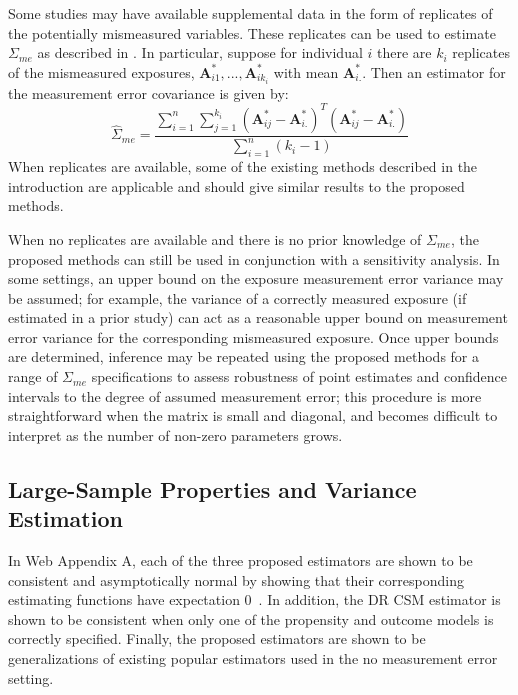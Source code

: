\documentclass[useAMS,usenatbib,referee]{biom}
\begin{document}
Some studies may have available supplemental data in the form of replicates of the potentially mismeasured variables. These replicates can be used to estimate $\Sigma_{me}$ as described in \citet{carroll2006}. In particular, suppose for individual $i$ there are $k_{i}$ replicates of the mismeasured exposures, $\bm{A}^{*}_{i1}, ..., \bm{A}^{*}_{ik_{i}}$ with mean $\bm{A}^{*}_{i.}$. Then an estimator for the measurement error covariance is given by:
\begin{equation*}
    \hat{\Sigma}_{me} = \frac{\sum_{i=1}^{n} \sum_{j=1}^{k_{i}} (\bm{A}^{*}_{ij} - \bm{A}^{*}_{i.})^{T}(\bm{A}^{*}_{ij} - \bm{A}^{*}_{i.})}{\sum_{i=1}^{n}(k_{i} - 1)}
\end{equation*}
When replicates are available, some of the existing methods described in the introduction are applicable and should give similar results to the proposed methods.

When no replicates are available and there is no prior knowledge of $\Sigma_{me}$, the proposed methods can still be used in conjunction with a sensitivity analysis. In some settings, an upper bound on the exposure measurement error variance may be assumed; for example, the variance of a correctly measured exposure (if estimated in a prior study) can act as a reasonable upper bound on measurement error variance for the corresponding mismeasured exposure. Once upper bounds are determined, inference may be repeated using the proposed methods for a range of $\Sigma_{me}$ specifications to assess robustness of point estimates and confidence intervals to the degree of assumed measurement error; this procedure is more straightforward when the matrix is small and diagonal, and becomes difficult to interpret as the number of non-zero parameters grows.

\subsection{Large-Sample Properties and Variance Estimation}

In Web Appendix A, each of the three proposed estimators are shown to be consistent and asymptotically normal by showing that their corresponding estimating functions have expectation 0~\citep{stefanski2002}. In addition, the DR CSM estimator is shown to be consistent when only one of the propensity and outcome models is correctly specified. Finally, the proposed estimators are shown to be generalizations of existing popular estimators used in the no measurement error setting.
\end{document}
